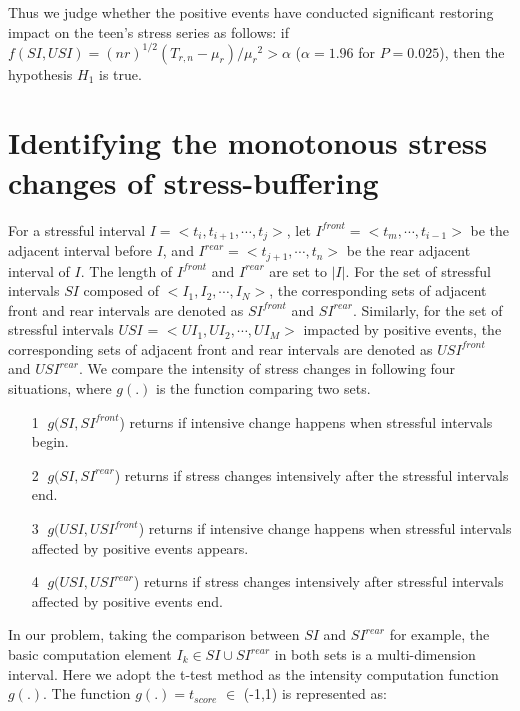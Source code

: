 Thus we judge whether the positive events have conducted significant restoring impact on the teen's stress series as follows:
if $f(SI,USI)=(nr)^{1/2}(T_{r,n}-\mu_{r})/{\mu_r}^2>\alpha$ ($\alpha = 1.96$ for $P=0.025$),
then the hypothesis $H_1$ is true.

\section{Identifying the monotonous stress changes of stress-buffering}
\label{mod:mod2}
For a stressful interval $I = <t_i,t_{i+1},\cdots,t_j>$,
let $I^{front} = <t_m,\cdots,t_{i-1}>$ be the adjacent interval before $I$,
and $I^{rear} = <t_{j+1},\cdots,t_n>$ be the rear adjacent interval of $I$.
The length of $I^{front}$ and $I^{rear}$ are set to $|I|$.
For the set of stressful intervals $SI$ composed of $<I_1,I_2,\cdots,I_N>$,
the corresponding sets of adjacent front and rear intervals are denoted as $SI^{front}$ and $SI^{rear}$.
Similarly, for the set of stressful intervals $USI$ = $<UI_1,UI_2,\cdots, UI_M>$ impacted by positive events,
the corresponding sets of adjacent front and rear intervals are denoted as $USI^{front}$ and $USI^{rear}$.
We compare the intensity of stress changes in following four situations,
where $g(.)$ is the function comparing two sets.

\begin{itemize}
\item[\textcircled{1}] $g(SI,SI^{front}$) returns if intensive change happens when stressful intervals begin.
\item[\textcircled{2}] $g(SI,SI^{rear}$) returns if stress changes intensively after the stressful intervals end.
\item[\textcircled{3}] $g(USI,USI^{front}$) returns if intensive change happens when stressful intervals affected by positive events appears.
\item[\textcircled{4}] $g(USI,USI^{rear}$) returns if stress changes intensively after stressful intervals affected by positive events end.
\end{itemize}

In our problem, taking the comparison between $SI$ and $SI^{rear}$ for example,
the basic computation element $I_k \in SI \cup SI^{rear}$ in both sets is a multi-dimension interval.
Here we adopt the t-test method as the intensity computation function $g(.)$.
The function $g(.) = t_{score}$ $\in$ (-1,1) is represented as:

